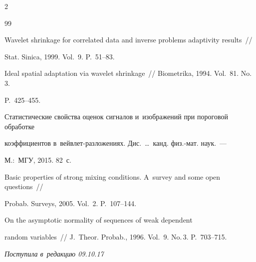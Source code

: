 \begin{multicols}{2}
{{\begin{thebibliography}{99}

Wavelet shrinkage for correlated data and inverse problems adaptivity results~// 

Stat. Sinica, 1999. Vol.~9. P.~51--83.









Ideal spatial adaptation via wavelet shrinkage~// Biometrika, 1994. Vol.~81. No.\,3.

P.~425--455.





Статистические свойства оценок сигналов и~изображений при пороговой обработке 

коэффициентов в~вейв\-лет-раз\-ло\-же\-ни\-ях. Дис.\ \ldots\ канд. физ.-мат. наук.~--- 

М.:~МГУ, 2015. 82~с.





Basic properties of strong mixing conditions. A~survey and some open questions~// 

Probab. Surveys, 2005. Vol.~2. P.~107--144.




 On the asymptotic normality of sequences of weak dependent 

random variables~// J.~Theor. Probab., 1996. Vol.~9. No.\,3. P.~703--715.



 \end{thebibliography}



 }

 }



\end{multicols}



\vspace*{-6pt}



\hfill{\small\textit{Поступила в~редакцию 09.10.17}}



